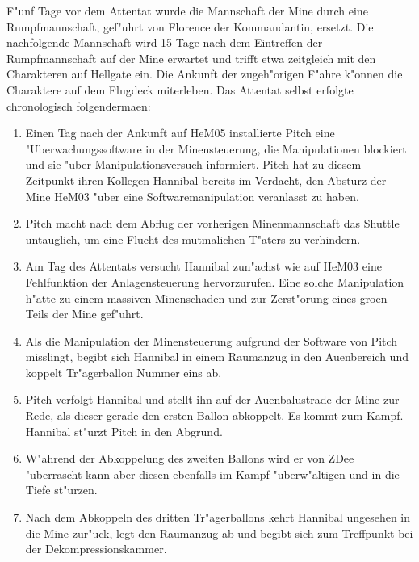 
F"unf Tage vor dem Attentat wurde die Mannschaft der Mine durch eine Rumpfmannschaft, gef"uhrt von Florence der Kommandantin, ersetzt. Die nachfolgende Mannschaft wird 15 Tage nach dem Eintreffen der Rumpfmannschaft auf der Mine erwartet und trifft etwa zeitgleich mit den Charakteren auf Hellgate ein. Die Ankunft der zugeh"origen F"ahre k"onnen die Charaktere auf dem Flugdeck miterleben. Das Attentat selbst erfolgte chronologisch folgenderma\3en:

\begin{enumerate}
	\item Einen Tag nach der Ankunft auf HeM05 installierte Pitch eine "Uberwachungssoftware in der Minensteuerung, die Manipulationen 	
		blockiert und sie "uber Manipulationsversuch informiert. Pitch hat zu diesem Zeitpunkt ihren Kollegen Hannibal bereits im Verdacht, den Absturz der Mine HeM03 "uber eine Softwaremanipulation veranlasst zu haben.
	\item Pitch macht nach dem Abflug der vorherigen Minenmannschaft das Shuttle untauglich, um eine Flucht des mutma\3lichen T"aters zu 
		verhindern.
	\item Am Tag des Attentats versucht Hannibal zun"achst wie auf HeM03 eine Fehlfunktion der Anlagensteuerung hervorzurufen. Eine solche 
		Manipulation h"atte zu einem massiven Minenschaden und zur Zerst"orung eines gro\3en Teils der Mine gef"uhrt.
	\item Als die Manipulation der Minensteuerung aufgrund der Software von Pitch misslingt, begibt sich Hannibal in einem Raumanzug in den 
		Au\3enbereich und koppelt Tr"agerballon Nummer eins ab.
	\item Pitch verfolgt Hannibal und stellt ihn auf der Au\3enbalustrade der Mine zur Rede, als dieser gerade den ersten Ballon abkoppelt. 
		Es kommt zum Kampf. Hannibal st"urzt Pitch in den Abgrund.
	\item W"ahrend der Abkoppelung des zweiten Ballons wird er von ZDee "uberrascht kann aber diesen ebenfalls im Kampf "uberw"altigen und 
		in die Tiefe st"urzen.
	\item Nach dem Abkoppeln des dritten Tr"agerballons kehrt Hannibal ungesehen in die Mine zur"uck, legt den Raumanzug ab und begibt sich 
		zum Treffpunkt bei der Dekompressionskammer.
\end{enumerate}


